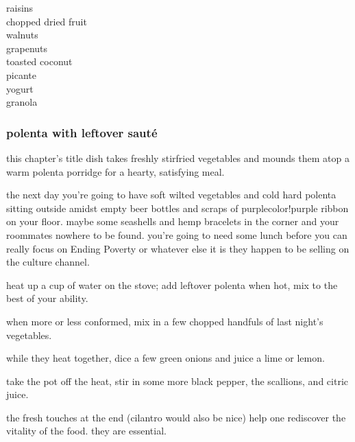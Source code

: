 \mbox{\hskip 1cm}\textsf{raisins}\\
\mbox{\hskip 2.5cm}\textsf{chopped dried fruit}\\
\mbox{\hskip 6cm}\textsf{walnuts}\\
\mbox{\hskip 1.5cm}\textsf{grapenuts}\\
\mbox{\hskip 3.5cm}\textsf{toasted coconut}\\
\mbox{\hskip 7cm}\textsf{picante}\\
\mbox{\hskip 2cm}\textsf{yogurt}\\
\mbox{\hskip 4.5cm}\textsf{granola}

\subsubsection{polenta with leftover saut\'{e}}

this chapter's title dish takes freshly stirfried vegetables and mounds 
them atop a warm polenta porridge for a hearty, satisfying meal.

the next day you're going to have soft wilted vegetables and cold hard 
polenta sitting outside amidst empty beer bottles and scraps of purple{color!purple} 
ribbon on your floor. maybe some seashells and hemp bracelets in the corner 
and your roommates nowhere to be found. you're going to need some lunch 
before you can really focus on Ending Poverty or whatever else it is they 
happen to be selling on the culture channel.

\begin{ingredients}

  \item heat up a cup of water on the stove; add leftover polenta when hot, 
  mix to the best of your ability.

  \item when more or less conformed, mix in a few chopped handfuls of last 
  night's vegetables.

  \item while they heat together, dice a few green onions and juice a lime or 
  lemon.

  \item take the pot off the heat, stir in some more black pepper, the 
  scallions, and citric juice.

\end{ingredients}

the fresh touches at the end (cilantro would also be nice) help one rediscover 
the vitality of the food. they are essential. 	

